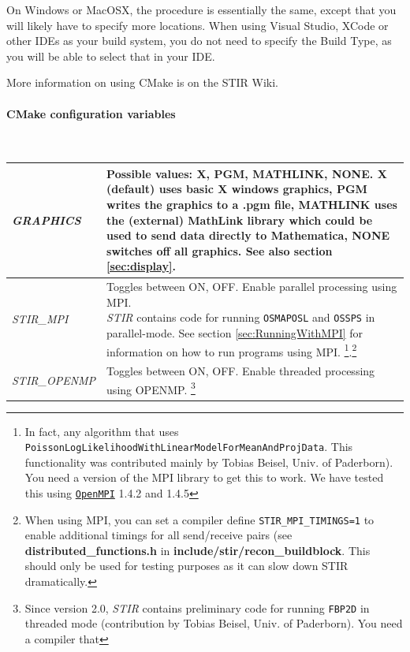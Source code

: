 \documentclass{article}
\def\url#1#2{\mbox{\href{#1}{\tt #2}}}
\newcommand{\subsubsubsection}[1]{\paragraph{#1}\mbox{} \\}
\begin{document}
On Windows or MacOSX, the procedure is essentially the same, except that you will likely have
to specify more locations. When using Visual Studio, XCode or other IDEs as  your build system,
you do not need to specify the Build Type, as you will be able to select that in
your IDE.

More information on using CMake is on the STIR Wiki.

{\subsubsubsection{CMake configuration variables}
}

\newlength{\MakeTableFirstCol}
\newlength{\MakeTableSecondCol}
\setlength{\MakeTableFirstCol}{1.5in}
\setlength{\MakeTableSecondCol}{\textwidth}
\addtolength{\MakeTableSecondCol}{-\MakeTableFirstCol}

\begin{longtable}{|p{\MakeTableFirstCol}|p{\MakeTableSecondCol}|}
\hline
{\raggedright \textit{GRAPHICS}} & 
{\raggedright Possible values: X, PGM, MATHLINK, NONE. X (default) uses basic 
X windows graphics, PGM writes the graphics to a .pgm file, MATHLINK 
uses the (external) MathLink library which could be used to send 
data directly to Mathematica, NONE switches off all graphics. See also section \ref{sec:display}.
} \\
\hline
{\raggedright \textit{STIR\_MPI}} & 
{\raggedright Toggles between ON, OFF. Enable parallel processing using MPI.\\
\textit{STIR} contains code for running \texttt{OSMAPOSL} and \texttt{OSSPS} in parallel-mode. 
See section \ref{sec:RunningWithMPI} for information on how to run programs using MPI.
\footnote{In fact, any algorithm that uses \texttt{PoissonLogLikelihoodWithLinearModelForMeanAndProjData}.
This functionality was contributed mainly by Tobias Beisel, Univ. of Paderborn). You need a version of the MPI library 
to get this to work. We have tested this using \url{http://www.open-mpi.org/}{OpenMPI} 1.4.2 and 1.4.5}.\footnote{
{When using MPI, you can set a compiler define \texttt{STIR\_MPI\_TIMINGS=1}} to
enable additional timings for all send/receive pairs 
(see \textbf{distributed\_functions.h} in \textbf{include/stir/recon\_buildblock}. 
This should only be used for testing purposes as it can slow down
STIR dramatically.}
} \\
\hline
{\raggedright \textit{STIR\_OPENMP}} & 
{\raggedright Toggles between ON, OFF. Enable threaded processing using OPENMP.
\footnote{Since version 2.0, \textit{STIR} contains preliminary code for running \texttt{FBP2D} in threaded mode
(contribution by Tobias Beisel, Univ. of Paderborn). You need a compiler that 
}}
\end{longtable}
\end{document}
